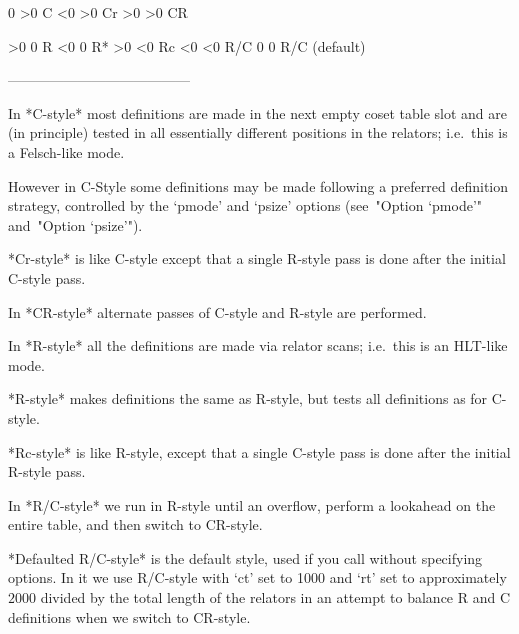    0           >0         C
  <0           >0         Cr
  >0           >0         CR

  >0            0         R
  <0            0         R*
  >0           <0         Rc
  <0           <0         R/C
   0            0         R/C (default)

---------------------------------------
\endtt

In *C-style*  most definitions are made in the  next empty coset table
slot  and  are (in  principle)  tested  in  all essentially  different
positions in the relators; i.e.~this is a Felsch-like mode.

However in C-Style some definitions may be made following a  preferred
definition strategy, controlled by the  `pmode'  and  `psize'  options
(see~"Option `pmode'" and~"Option `psize'").

*Cr-style* is like  C-style except that a single R-style  pass is done
after the initial C-style pass.

In *CR-style* alternate passes of C-style and R-style are performed.

In *R-style*  all   the  definitions  are   made  via  relator  scans; 
i.e.~this is an HLT-like mode.

*R\*-style*  makes  definitions the  same as  R-style,  but  tests all
definitions as for C-style.

*Rc-style* is like R-style, except  that a single C-style pass is done
after the initial R-style pass.

In  *R/C-style*  we  run  in  R-style  until  an  overflow, perform  a
lookahead on the entire table, and then switch to CR-style.

*Defaulted R/C-style*  is the default  style, used if  you call {\ACE}
without specifying  options. In it we  use R/C-style with  `ct' set to
1000 and `rt' set to  approximately $2000$ divided by the total length
of the relators  in an attempt to balance R and  C definitions when we
switch to CR-style.


